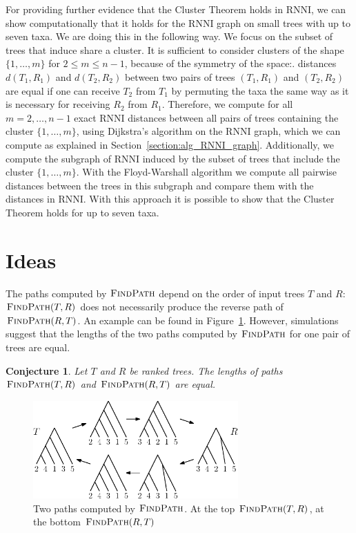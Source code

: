 \documentclass{amsart}
\newcommand{\rnni}{\mathrm{RNNI}}
\newcommand{\findpath}{\textsc{FindPath}}
\newtheorem{conjecture}[definition]{Conjecture}
\begin{document}
For providing further evidence that the Cluster Theorem holds in $\rnni$, we can show computationally that it holds for the $\rnni$ graph on small trees with up to seven taxa.
We are doing this in the following way.
We focus on the subset of trees that induce share a cluster.
It is sufficient to consider clusters of the shape $\{1, \ldots, m\}$ for $2 \leq m \leq n-1$, because of the symmetry of the space:.
distances $d(T_1,R_1)$ and $d(T_2,R_2)$ between two pairs of trees $(T_1,R_1)$ and $(T_2,R_2)$ are equal if one can receive $T_2$ from $T_1$ by permuting the taxa the same way as it is necessary for receiving $R_2$ from $R_1$.
Therefore, we compute for all $m = 2, \ldots, n-1$ exact $\rnni$ distances between all pairs of trees containing the cluster $\{1, \ldots, m\}$, using Dijkstra's algorithm \autocite{Dijkstra1959-ph} on the $\rnni$ graph, which we can compute as explained in Section~\ref{section:alg_RNNI_graph}.
Additionally, we compute the subgraph of $\rnni$ induced by the subset of trees that include the cluster $\{1, \ldots, m\}$.
With the Floyd-Warshall algorithm we compute all pairwise distances between the trees in this subgraph and compare them with the distances in $\rnni$.
With this approach it is possible to show that the Cluster Theorem holds for up to seven taxa.


\section{Ideas}


The paths computed by $\findpath$ depend on the order of input trees $T$ and $R$:
$\findpath(T,R)$ does not necessarily produce the reverse path of $\findpath(R,T)$.
An example can be found in Figure~\ref{fig:findpath_not_symmetric}.
However, simulations suggest that the lengths of the two paths computed by $\findpath$ for one pair of trees are equal.

\begin{conjecture}
    Let $T$ and $R$ be ranked trees.
    The lengths of paths $\findpath(T,R)$ and $\findpath(R,T)$ are equal.
\end{conjecture}

\begin{figure}[H]
	\centering
	\includegraphics[width=0.7\textwidth]{findpath_not_symmetric}
    \vspace{2pt}
	\caption{Two paths computed by $\findpath$. At the top $\findpath(T,R)$, at the bottom $\findpath(R,T)$}
	\label{fig:findpath_not_symmetric}
\end{figure}
\end{document}
